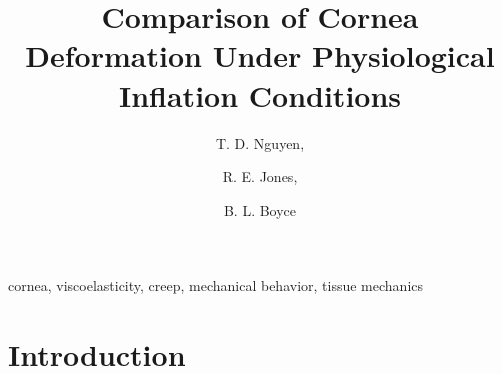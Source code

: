 \documentclass[11pt,oneside]{elsart}
\begin{document}
%
\begin{frontmatter}
\title{Comparison of Cornea Deformation Under Physiological Inflation Conditions}
\author[au]{T. D. Nguyen,}
\author[cau1]{R. E. Jones,} 
\author[cau2]{B. L. Boyce}

\address[au]{Department of Mechanical Engineering, Johns Hopkins University, 125 Latrobe Hall, Baltimore, MD 21218, USA}
\address[cau2]{Mechanics of Materials Department, Sandia National Laboratories, P.O. Box 0969, Livermore, CA 94551, USA}
\address[cau1]{Microsystems Materials Department, Sandia National Laboratories,
P.O. Box 5800, Albuquerque, NM 87123}

\begin{abstract}

\end{abstract}

\begin{keyword}
  cornea, viscoelasticity, creep, mechanical behavior, tissue mechanics
\PACS
\end{keyword}
\end{frontmatter}




\section{Introduction}
\label{sec:bulge_background}
\end{document}

